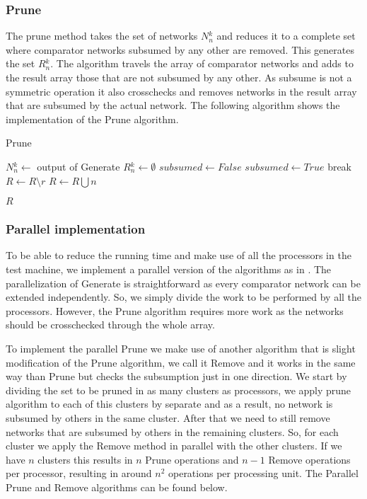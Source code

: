 \documentclass[../main.tex]{subfiles}
\begin{document}
	\subsubsection{Prune}
	The prune method takes the set of networks $N{_n^{k}}$ and reduces it to a complete set where comparator networks subsumed by any other are removed. This generates the set $R{_n^k}$. The algorithm travels the array of comparator networks and adds to the result array those that are not subsumed by any other. As subsume is not a symmetric operation it also crosschecks and removes networks in the result array that are subsumed by the actual network. The following algorithm shows the implementation of the Prune algorithm. 
	\begin{algorithm}[H]
		\caption{Prune} 
		\begin{algorithmic}
			\State $N{_n^k} \leftarrow$ output of Generate
			\State $R{_n^k} \leftarrow \emptyset$
			\State $subsumed \leftarrow False$
						\State $subsumed \leftarrow True$
						\State break
					\EndIf
						\State $R \leftarrow R \setminus r$
					\EndIf
				\EndFor
					\State $R \leftarrow R \bigcup n$
				\EndIf
			\EndFor
			
		\Return $R$
		\end{algorithmic}
	\end{algorithm}
	
	\subsubsection{Parallel implementation}
	To be able to reduce the running time and make use of all the processors in the test machine, we implement a parallel version of the algorithms as in \cite{sortingnineinputs}. The parallelization of Generate is straightforward as every comparator network can be extended independently. So, we simply divide the work to be performed by all the processors.
	However, the Prune algorithm requires more work as the networks should be crosschecked through the whole array.
	
	To implement the parallel Prune we make use of another algorithm that is slight modification of the Prune algorithm, we call it Remove and it works in the same way than Prune but checks the subsumption just in one direction. We start by dividing the set to be pruned in as many clusters as processors, we apply prune algorithm to each of this clusters by separate and as a result, no network is subsumed by others in the same cluster. After that we need to still remove networks that are subsumed by others in the remaining clusters. So, for each cluster we apply the Remove method in parallel with the other clusters. If we have $n$ clusters this results in $n$ Prune operations and $n - 1$ Remove operations per processor, resulting in around $n^2$ operations per processing unit. The Parallel Prune and Remove algorithms can be found below.
	
\end{document}
